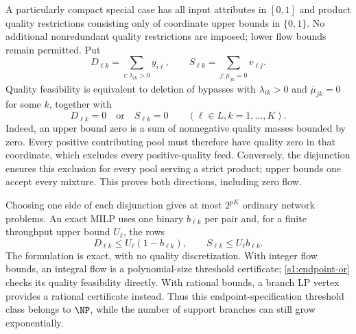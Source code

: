 A particularly compact special case has all input attributes in $[0,1]$
and product quality restrictions consisting only of coordinate upper
bounds in $\{0,1\}$. No additional nonredundant quality restrictions
are imposed; lower flow bounds remain permitted. Put
\[
 D_{\ell k}=\sum_{i:\lambda_{ik}>0}y_{i\ell},\qquad
 S_{\ell k}=\sum_{j:\overline\mu_{jk}=0}v_{\ell j}.
\]
Quality feasibility is equivalent to deletion of bypasses with
$\lambda_{ik}>0$ and $\overline\mu_{jk}=0$ for some $k$, together with
\begin{equation}
 D_{\ell k}=0\quad\text{or}\quad S_{\ell k}=0
             \qquad(\ell\in L, k=1,\ldots,K).\label{s1:endpoint-or}
\end{equation}
Indeed, an upper bound zero is a sum of nonnegative quality masses
bounded by zero. Every positive contributing pool must therefore have
quality zero in that coordinate, which excludes every positive-quality
feed. Conversely, the disjunction ensures this exclusion for every
pool serving a strict product; upper bounds one accept every mixture.
This proves both directions, including zero flow.

Choosing one side of each disjunction gives at most $2^{pK}$ ordinary
network problems. An exact MILP uses one binary $b_{\ell k}$ per pair
and, for a finite throughput upper bound $U_\ell$, the rows
\[
 D_{\ell k}\le U_\ell(1-b_{\ell k}),\qquad
 S_{\ell k}\le U_\ell b_{\ell k}.
\]
The formulation is exact, with no quality discretization. With integer
flow bounds, an integral flow is a polynomial-size threshold certificate;
\eqref{s1:endpoint-or} checks its quality feasibility directly. With
rational bounds, a branch LP vertex provides a rational certificate
instead. Thus this endpoint-specification threshold class belongs to
$\NP$, while the number of support branches can still grow exponentially.
